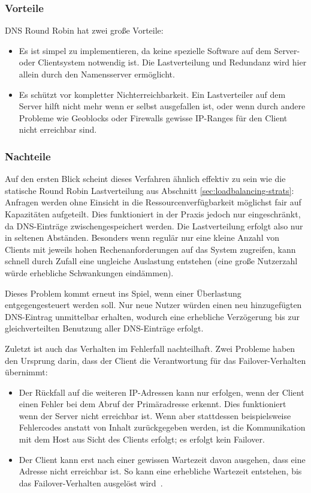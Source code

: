 \subsubsection{Vorteile}
DNS Round Robin hat zwei große Vorteile:
\begin{itemize}
	\item Es ist simpel zu implementieren, da keine spezielle Software auf dem Server- oder Clientsystem notwendig ist. Die Lastverteilung und Redundanz wird hier allein durch den Namensserver ermöglicht.
	\item Es schützt vor kompletter Nichterreichbarkeit. Ein Lastverteiler auf dem Server hilft nicht mehr wenn er selbst ausgefallen ist, oder wenn durch andere Probleme wie Geoblocks oder Firewalls gewisse IP-Ranges für den Client nicht erreichbar sind.
\end{itemize}

\subsubsection{Nachteile}
Auf den ersten Blick scheint dieses Verfahren ähnlich effektiv zu sein wie die statische Round Robin Lastverteilung aus Abschnitt \ref{sec:loadbalancing-strats}: Anfragen werden ohne Einsicht in die Ressourcenverfügbarkeit möglichst fair auf Kapazitäten aufgeteilt. Dies funktioniert in der Praxis jedoch nur eingeschränkt, da DNS-Einträge zwischengespeichert werden. Die Lastverteilung erfolgt also nur in seltenen Abständen. Besonders wenn regulär nur eine kleine Anzahl von Clients mit jeweils hohen Rechenanforderungen auf das System zugreifen, kann schnell durch Zufall eine ungleiche Auslastung entstehen (eine große Nutzerzahl würde erhebliche Schwankungen eindämmen).

Dieses Problem kommt erneut ins Spiel, wenn einer Überlastung entgegengesteuert werden soll. Nur neue Nutzer würden einen neu hinzugefügten DNS-Eintrag unmittelbar erhalten, wodurch eine erhebliche Verzögerung bis zur gleichverteilten Benutzung aller DNS-Einträge erfolgt.

Zuletzt ist auch das Verhalten im Fehlerfall nachteilhaft. Zwei Probleme haben den Ursprung darin, dass der Client die Verantwortung für das Failover-Verhalten übernimmt:
\begin{itemize}
	\item Der Rückfall auf die weiteren IP-Adressen kann nur erfolgen, wenn der Client einen Fehler bei dem Abruf der Primäradresse erkennt. Dies funktioniert wenn der Server nicht erreichbar ist. Wenn aber stattdessen beispielsweise Fehlercodes anstatt von Inhalt zurückgegeben werden, ist die Kommunikation mit dem Host aus Sicht des Clients erfolgt; es erfolgt kein Failover.
	\item Der Client kann erst nach einer gewissen Wartezeit davon ausgehen, dass eine Adresse nicht erreichbar ist. So kann eine erhebliche Wartezeit entstehen, bis das Failover-Verhalten ausgelöst wird~\cite{so-dns-slow}.%








\end{itemize}
